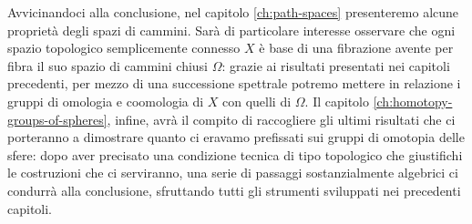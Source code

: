 Avvicinandoci alla conclusione, nel capitolo \ref{ch:path-spaces} presenteremo alcune proprietà degli spazi di cammini. Sarà di particolare interesse osservare che ogni spazio topologico semplicemente connesso $X$ è base di una fibrazione avente per fibra il suo spazio di cammini chiusi $\Omega$: grazie ai risultati presentati nei capitoli precedenti, per mezzo di una successione spettrale potremo mettere in relazione i gruppi di omologia e coomologia di $X$ con quelli di $\Omega$. Il capitolo \ref{ch:homotopy-groups-of-spheres}, infine, avrà il compito di raccogliere gli ultimi risultati che ci porteranno a dimostrare quanto ci eravamo prefissati sui gruppi di omotopia delle sfere: dopo aver precisato una condizione tecnica di tipo topologico che giustifichi le costruzioni che ci serviranno, una serie di passaggi sostanzialmente algebrici ci condurrà alla conclusione, sfruttando tutti gli strumenti sviluppati nei precedenti capitoli.

